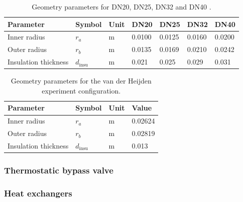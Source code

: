 \begin{table}[h!]
\centering
\caption{Geometry parameters for DN20, DN25, DN32 and DN40 \cite{VIB2025}.}
\label{tab:pipe_dn_geometry}
\begin{tabular}{lllllll}
\hline
\textbf{Parameter} & \textbf{Symbol} & \textbf{Unit} & \textbf{DN20} & \textbf{DN25} & \textbf{DN32} & \textbf{DN40} \\
\hline
Inner radius         & $r_a$  & m & 0.0100 & 0.0125 & 0.0160 & 0.0200 \\
Outer radius         & $r_b$  & m & 0.0135 & 0.0169 & 0.0210 & 0.0242 \\
Insulation thickness & $d_{\text{insu}}$     & m & 0.021  & 0.025  & 0.029  & 0.031  \\
\hline
\end{tabular}
\end{table}

\begin{table}[h!]
\centering
\caption{Geometry parameters for the van der Heijden experiment configuration.}
\label{tab:pipe_heijden_geometry}
\begin{tabular}{llll}
\hline
\textbf{Parameter} & \textbf{Symbol} & \textbf{Unit} & \textbf{Value} \\
\hline
Inner radius         & $r_a$  & m & 0.02624 \\
Outer radius         & $r_b$  & m & 0.02819 \\
Insulation thickness & $d_{\text{insu}}$     & m & 0.013   \\
\hline
\end{tabular}
\end{table}

\subsubsection{Thermostatic bypass valve}

\subsubsection{Heat exchangers}

